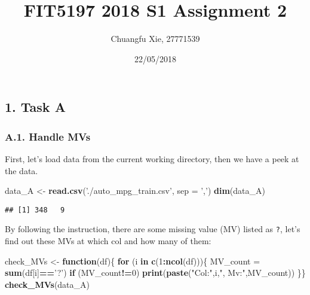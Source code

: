 \documentclass[]{article}
\title{FIT5197 2018 S1 Assignment 2}
\author{Chuangfu Xie, 27771539}
\date{22/05/2018}
\newenvironment{Shaded}{\begin{snugshade}}{\end{snugshade}}
\newcommand{\KeywordTok}[1]{\textcolor[rgb]{0.13,0.29,0.53}{\textbf{#1}}}
\newcommand{\DataTypeTok}[1]{\textcolor[rgb]{0.13,0.29,0.53}{#1}}
\newcommand{\DecValTok}[1]{\textcolor[rgb]{0.00,0.00,0.81}{#1}}
\newcommand{\StringTok}[1]{\textcolor[rgb]{0.31,0.60,0.02}{#1}}
\newcommand{\ControlFlowTok}[1]{\textcolor[rgb]{0.13,0.29,0.53}{\textbf{#1}}}
\newcommand{\OperatorTok}[1]{\textcolor[rgb]{0.81,0.36,0.00}{\textbf{#1}}}
\newcommand{\NormalTok}[1]{#1}
\begin{document}
\maketitle

\subsection{1. Task A}\label{task-a}

\subsubsection{A.1. Handle MVs}\label{a.1.-handle-mvs}

First, let's load data from the current working directory, then we have
a peek at the data.

\begin{Shaded}
\begin{Highlighting}[]
\NormalTok{data_A <-}\StringTok{ }\KeywordTok{read.csv}\NormalTok{(}\StringTok{'./auto_mpg_train.csv'}\NormalTok{, }\DataTypeTok{sep =} \StringTok{','}\NormalTok{)}
\KeywordTok{dim}\NormalTok{(data_A)}
\end{Highlighting}
\end{Shaded}

\begin{verbatim}
## [1] 348   9
\end{verbatim}

By following the instruction, there are some missing value (MV) listed
as \texttt{\textquotesingle{}?\textquotesingle{}}, let's find out these
MVs at which col and how many of them:

\begin{Shaded}
\begin{Highlighting}[]
\NormalTok{check_MVs <-}\StringTok{ }\ControlFlowTok{function}\NormalTok{(df)\{}
    \ControlFlowTok{for}\NormalTok{ (i }\ControlFlowTok{in} \KeywordTok{c}\NormalTok{(}\DecValTok{1}\OperatorTok{:}\KeywordTok{ncol}\NormalTok{(df)))\{}
\NormalTok{        MV_count =}\StringTok{ }\KeywordTok{sum}\NormalTok{(df[i]}\OperatorTok{==}\StringTok{'?'}\NormalTok{)}
        \ControlFlowTok{if}\NormalTok{ (MV_count}\OperatorTok{!=}\DecValTok{0}\NormalTok{) }\KeywordTok{print}\NormalTok{(}\KeywordTok{paste}\NormalTok{(}\StringTok{"Col:"}\NormalTok{,i,}\StringTok{", Mv:"}\NormalTok{,MV_count))}
\NormalTok{\}\}}
\KeywordTok{check_MVs}\NormalTok{(data_A)}
\end{Highlighting}
\end{Shaded}
\end{document}
